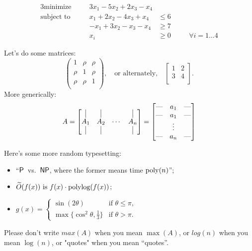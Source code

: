 \begin{alignat*}{3}
    \text{minimize}&   \quad & 3x_1 - 5x_2 + 2x_3 - x_4&       & &\\
    \text{subject to}& \quad & x_1 + 2x_2 - 4x_3 + x_4 &\leq 6 & &\\
                           & & -x_1 + 3x_2 - x_3 - x_4 &\geq 7 & &\\
                           & & x_i &\geq 0  & &\quad \forall i = 1\dots 4
\end{alignat*}


Let's do some matrices:
\[
\begin{pmatrix}
    1 & \rho & \rho\\
    \rho & 1 & \rho\\
    \rho & \rho & 1\\
\end{pmatrix},
\quad \text{or alternately,} \quad
\begin{bmatrix}
    1 & 2 \\
    3 & 4 \\
\end{bmatrix}.
\]
More generically:
\[
    A = \begin{bmatrix}
            \vrule & \vrule & & \vrule\\
            A_{1} & A_{2} & \cdots & A_{n} \\
            \vrule & \vrule & & \vrule
        \end{bmatrix}
      = \begin{bmatrix}
            \text{---} & a_1 & \text{---} \\
            \text{---} & a_1 & \text{---} \\
                       & \vdots &  \\
            \text{---} & a_n & \text{---} 
        \end{bmatrix}
\]


Here's some more random typesetting: 
\begin{itemize}
\item ``$\mathsf{P}$~vs.~$\mathsf{NP}$, where the former means time $\mathrm{poly}(n)$'';
\item $\widetilde{O}(f(x)) \text{ is } f(x) \cdot \mathrm{polylog}(f(x))$;
\item $\displaystyle 
        g(x) = \begin{cases}
                   \sin(2\theta) & \text{if $\theta \leq \pi$,}\\
                   \max\{\cos^2\theta, \tfrac13\} & \text{if $\theta > \pi$.}
               \end{cases}
      $
      
\end{itemize}
Please don't write $max(A)$ when you mean $\max(A)$, or $log(n)$ when you mean $\log(n)$, or "quotes" when you mean ``quotes''.\\

